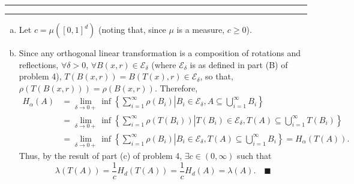 \documentclass[11pt]{article}
\newcounter{questionCounter}
\newcounter{partCounter}[questionCounter]
\newenvironment{question}[2][\arabic{questionCounter}]{%
    \setcounter{partCounter}{0}%
    \vspace{.25in} \hrule \vspace{0.5em}%
        \noindent{\bf #2}%
    \vspace{0.8em} \hrule \vspace{.10in}%
    \addtocounter{questionCounter}{1}%
}{}
\newcommand{\mqed}{\quad \blacksquare}
\begin{document}
\begin{question}{Problem 3}
\begin{enumerate}[(a)]
\item Let $c = \mu([0,1]^d)$ (noting that, since $\mu$ is a measure,
$c \geq 0$).

\item Since any orthogonal linear transformation is a composition of rotations
and reflections, $\forall \delta > 0$,
$\forall B(x,r) \in \mathcal{E}_{\delta}$ (where $\mathcal{E}_{\delta}$ is as
defined in part (B) of problem 4),
$T(B(x,r)) = B(T(x),r) \in \mathcal{E}_{\delta}$, so that,
$\rho(T(B(x,r))) = \rho(B(x,r))$.
Therefore,
\begin{align*}
H_{\alpha}(A)
 & = \lim_{\delta \rightarrow 0+} \inf
        \left\{\sum_{i = 1}^{\infty} \rho(B_i) \right|
        \left.B_i \in \mathcal{E}_{\delta},
            A \subseteq \bigcup_{i = 1}^{\infty} B_i \right\}       \\
 & = \lim_{\delta \rightarrow 0+} \inf
        \left\{\sum_{i = 1}^{\infty} \rho(T(B_i)) \right|
        \left.T(B_i) \in \mathcal{E}_{\delta},
            T(A) \subseteq \bigcup_{i = 1}^{\infty} T(B_i) \right\} \\
 & = \lim_{\delta \rightarrow 0+} \inf
        \left\{\sum_{i = 1}^{\infty} \rho(B_i) \right|
        \left.B_i \in \mathcal{E}_{\delta},
            T(A) \subseteq \bigcup_{i = 1}^{\infty} B_i \right\}
   = H_{\alpha}(T(A)).
\end{align*}
Thus, by the result of part (c) of problem 4, $\exists c \in (0,\infty)$ such
that
\[\lambda(T(A))
 = \frac{1}{c}H_d(T(A))
 = \frac{1}{c}H_d(A)
 = \lambda(A). \mqed\]
\end{enumerate}
\end{question}
\end{document}
